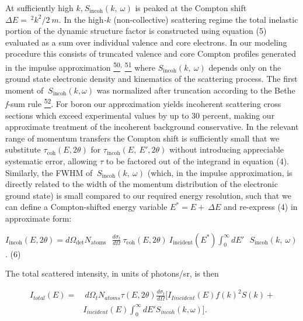 At sufficiently high
\(k\),\(\ S_{\text{incoh}}\left( k,\ \omega \right)\) is peaked at the
Compton shift \(\Delta E = \ ^{2}k^{2}/2\ m\). In the high\emph{-}\(k\)
(non-collective) scattering regime the total inelastic portion of the
dynamic structure factor is constructed using equation (5) evaluated as
a sum over individual valence and core electrons. In our modeling
procedure this consists of truncated valence and core Compton profiles
generated in the impulse approximation
\hyperref[w.-schuelke-electron-dynamics-by-inelastic-x-ray-scattering-oxford-university-press-new-york-2007.]{\textsuperscript{50}}\textsuperscript{,}
\hyperref[p.-eisenberger-and-p.-m.-platzman-physical-review-a-2-415-1970.]{\textsuperscript{51}}
where \(S_{\text{incoh}}\left( k,\ \omega \right)\) depends only on the
ground state electronic density and kinematics of the scattering
process. The first moment of
\(\ S_{\text{incoh}}\left( k,\omega \right)\) was normalized after
truncation according to the Bethe \emph{f}-sum rule
\hyperref[b.-a.-mattern-g.-t.-seidler-j.-j.-kas-j.-i.-pacold-and-j.-j.-rehr-physical-review-b-85-115135-2012.]{\textsuperscript{52}}.
For boron our approximation yields incoherent scattering cross sections
which exceed experimental values by up to 30 percent, making our
approximate treatment of the incoherent background conservative. In the
relevant range of momentum transfers the Compton shift is sufficiently
small that we substitute \(\tau_{\text{coh}}\left( E,2\theta \right)\)
for \(\tau_{\text{incoh}}\left( E,\ E',2\theta \right)\) without
introducing appreciable systematic error, allowing \(\tau\) to be
factored out of the integrand in equation (4). Similarly, the FWHM of
\(\ S_{\text{incoh}}\left( k,\ \omega \right)\) (which, in the impulse
approximation, is directly related to the width of the momentum
distribution of the electronic ground state) is small compared to our
required energy resolution, such that we can define a Compton-shifted
energy variable \(E^{*} = E + \ \Delta E\) and re-express (4) in
approximate form:

\(I_{\text{incoh}}\left( E,2\theta \right) = d\Omega_{\det}N_{\text{atoms}}\text{\ \ }\frac{d\sigma_{t}}{d\Omega}\ \tau_{\text{coh}}\left( E,2\theta \right)\ I_{\text{incident}}\left( E^{*} \right)\int_{0}^{\infty}{dE'}\text{\ \ }S_{\text{incoh}}\left( k,\ \omega \right)\).
(6)

The total scattered intensity, in units of photons/sr, is then

\begin{equation}
\begin{aligned}
I_{total}(E) = &~d\Omega_{t} N_{atoms} \tau(E, 2\theta) \frac{d\sigma_t}{d\Omega} [I_{Iincident}(E) f(k)^2 S(k) +\\
& I_{incident}(E) \int_0^\infty dE' S_{incoh}(k, \omega)].
\end{aligned}
\end{equation}

